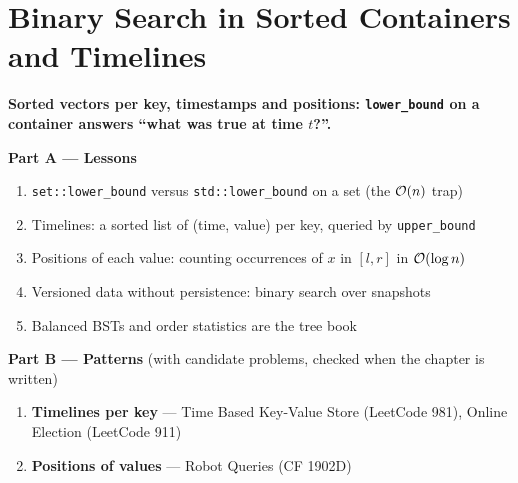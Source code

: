 \chapter{Binary Search in Sorted Containers and Timelines}
\label{ch:containers}

\begin{tcolorbox}[enhanced, colback=white, colframe=secondaryblue, boxrule=1pt, arc=2mm]
\textbf{\large\textcolor{primaryblue}{Sorted vectors per key, timestamps and positions: \texttt{lower\_bound} on a container answers ``what was true at time $t$?''.}}
\end{tcolorbox}


\begin{plannedbox}
\textbf{Part A --- Lessons}
\begin{enumerate}[leftmargin=*, label=\textbf{A\arabic*.}, itemsep=1pt]
    \item \texttt{set::lower\_bound} versus \texttt{std::lower\_bound} on a set (the $\mathcal{O}(n)$ trap)
    \item Timelines: a sorted list of (time, value) per key, queried by \texttt{upper\_bound}
    \item Positions of each value: counting occurrences of $x$ in $[l, r]$ in $\mathcal{O}(\log n)$
    \item Versioned data without persistence: binary search over snapshots
    \item Balanced BSTs and order statistics are the tree book
\end{enumerate}
\textbf{Part B --- Patterns} (with candidate problems, checked when the chapter is written)
\begin{enumerate}[leftmargin=*, label=\textbf{P\arabic*.}, itemsep=1pt]
    \item \textbf{Timelines per key} --- Time Based Key-Value Store {\small\color{darkgray}(LeetCode 981)}, Online Election {\small\color{darkgray}(LeetCode 911)}
    \item \textbf{Positions of values} --- Robot Queries {\small\color{darkgray}(CF 1902D)}
\end{enumerate}
\end{plannedbox}
